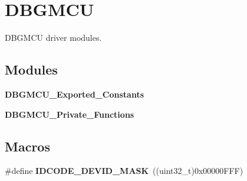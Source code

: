 \section{D\+B\+G\+M\+CU}
\label{group__DBGMCU}


D\+B\+G\+M\+CU driver modules.  


\subsection*{Modules}
\begin{DoxyCompactItemize}
\item 
\textbf{ D\+B\+G\+M\+C\+U\+\_\+\+Exported\+\_\+\+Constants}
\item 
\textbf{ D\+B\+G\+M\+C\+U\+\_\+\+Private\+\_\+\+Functions}
\end{DoxyCompactItemize}
\subsection*{Macros}
\begin{DoxyCompactItemize}
\item 
\#define \textbf{ I\+D\+C\+O\+D\+E\+\_\+\+D\+E\+V\+I\+D\+\_\+\+M\+A\+SK}~((uint32\+\_\+t)0x00000\+F\+F\+F)
\end{DoxyCompactItemize}
